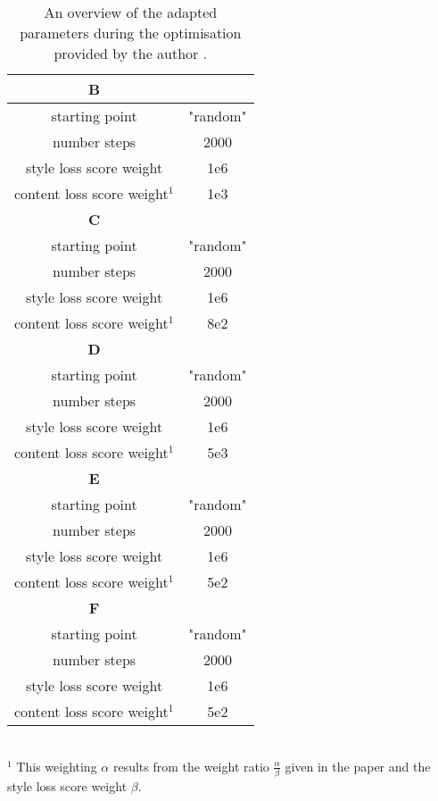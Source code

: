 \newpage
\begin{table*}[!t]
	\renewcommand{\arraystretch}{1.3}
	\caption{An overview of the adapted parameters during the optimisation provided by the author \cite{GEB2016}.}
	\label{tab:Gatys_2016_adapted_params}
	\centering
	\begin{tabular}{c|c}
		\hline
		\bfseries B &  \\
		\hline
		starting point & "random" \\
		number steps & 2000  \\
		style loss score weight & 1e6 \\
		content loss score weight$^1$ &  1e3\\
		\hline
		\bfseries C &  \\
		\hline
		starting point & "random" \\
		number steps & 2000  \\
		style loss score weight & 1e6 \\
		content loss score weight$^1$ &  8e2\\
		\hline
		\bfseries D &  \\
		\hline
		starting point & "random" \\
		number steps & 2000  \\
		style loss score weight & 1e6 \\
		content loss score weight$^1$ &  5e3\\
		\hline
		\bfseries E &  \\
		\hline
		starting point & "random" \\
		number steps & 2000  \\
		style loss score weight & 1e6 \\
		content loss score weight$^1$ &  5e2\\
		\hline
		\bfseries F &  \\
		\hline
		starting point & "random" \\
		number steps & 2000  \\
		style loss score weight & 1e6 \\
		content loss score weight$^1$ &  5e2\\
		\hline
	\end{tabular}
\footnotesize{
	\\$^1$ This weighting $\alpha$ results from the weight ratio $\frac{\alpha}{\beta}$ given in the paper and the style loss score weight $\beta$.
}
\end{table*}

